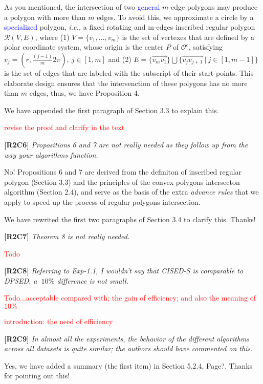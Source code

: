 \documentclass{letter}
\newcommand{\ie}{\emph{i.e.,}\xspace}
\newcommand{\pcircle}[1]{{$\mathcal{O}^c{#1}$}}
\begin{document}
As you mentioned, the intersection of two \textcolor{blue}{general} $m$-edge polygons may produce a polygon with more than $m$ edges. To avoid this, we approximate a circle by a \textcolor{blue}{specialized} polygon, \ie a fixed rotating and m-edges inscribed regular polygon $\mathcal{R}(V, E)$,
where (1) $V=\{v_1, \ldots, v_{m}\}$ is the set of vertexes that are defined by a polar coordinate system, whose origin is the center $P$ of \pcircle{}, satisfying $v_j = (r, \frac{(j-1)}{m}2\pi), ~j \in [1, m]$
and (2) $E= \{\overrightarrow{v_mv_1}\} \bigcup \{\overrightarrow{v_jv_{j+1}}\ |\ j\in [1, m-1]\}$ is the set of edges that are labeled with the subscript of their start points.
This elaborate design ensures that the intersenction of these polygons has no more than $m$ edges, thus, we have Proposition 4.

We have appended the first paragraph of Section 3.3 to explain this. 

\textcolor{red}{revise the proof and clarify in the text}


\textbf{[R2C6]} \emph{Propositions 6 and 7 are not really needed as they follow up from the way your algorithms function.}

No! Propositions 6 and 7 are derived from the definiton of inscribed regular polygon (Section 3.3) and the principles of the convex polygons intersecton algorithm (Section 2.4), and serve as the basis of the extra \emph{advance rules} that we apply to speed up the process of regular polygons intersection. 

We have rewrited the first two paragraphs of Section 3.4 to clarify this. Thanks!

\textbf{[R2C7]} \emph{Theorem 8 is not really needed.}

\textcolor{red}{Todo}

\textbf{[R2C8]} \emph{Referring to Exp-1.1, I wouldn't say that CISED-S is comparable to DPSED, a $~10\%$ difference is not small.}

\textcolor{red}{Todo...acceptable compared with; the gain of efficiency; and also the meaning of $10\%$}

\textcolor{red}{introduction: the need of efficiency}

\textbf{[R2C9]} \emph{In almost all the experiments, the behavior of the different algorithms across all datasets is quite similar; the authors should have commented on this.}

Yes, we have added a summary (the first item) in Section 5.2.4, Page?. Thanks for pointing out this!
\end{document}
